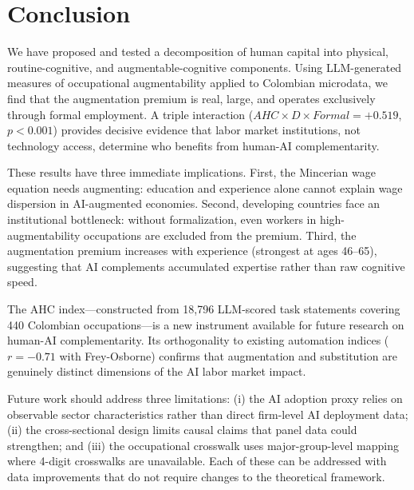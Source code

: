 \documentclass[a4paper,fleqn]{cas-dc}
\begin{document}
\section{Conclusion}
\label{sec:conclusion}

We have proposed and tested a decomposition of human capital into physical, routine-cognitive, and augmentable-cognitive components. Using LLM-generated measures of occupational augmentability applied to Colombian microdata, we find that the augmentation premium is real, large, and operates exclusively through formal employment. A triple interaction ($AHC \times D \times Formal = +0.519$, $p < 0.001$) provides decisive evidence that labor market institutions, not technology access, determine who benefits from human-AI complementarity.

These results have three immediate implications. First, the Mincerian wage equation needs augmenting: education and experience alone cannot explain wage dispersion in AI-augmented economies. Second, developing countries face an institutional bottleneck: without formalization, even workers in high-augmentability occupations are excluded from the premium. Third, the augmentation premium increases with experience (strongest at ages 46--65), suggesting that AI complements accumulated expertise rather than raw cognitive speed.

The AHC index---constructed from 18,796 LLM-scored task statements covering 440 Colombian occupations---is a new instrument available for future research on human-AI complementarity. Its orthogonality to existing automation indices ($r = -0.71$ with Frey-Osborne) confirms that augmentation and substitution are genuinely distinct dimensions of the AI labor market impact.

Future work should address three limitations: (i) the AI adoption proxy relies on observable sector characteristics rather than direct firm-level AI deployment data; (ii) the cross-sectional design limits causal claims that panel data could strengthen; and (iii) the occupational crosswalk uses major-group-level mapping where 4-digit crosswalks are unavailable. Each of these can be addressed with data improvements that do not require changes to the theoretical framework.





\end{document}
